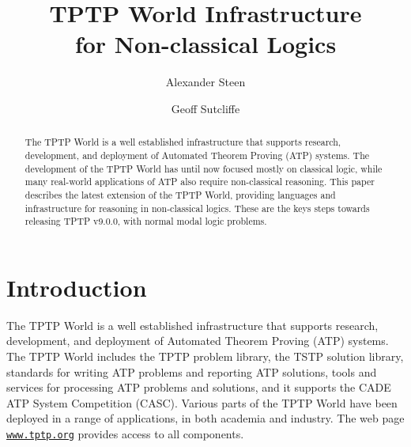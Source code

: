 \documentclass[runningheads]{llncs}
\begin{document}
\title{TPTP World Infrastructure \\ for Non-classical Logics}

\author{Alexander Steen 
\and
Geoff Sutcliffe}

\maketitle
\begin{abstract}
The TPTP World is a well established infrastructure that supports research, 
development, and deployment of Automated Theorem Proving (ATP) systems.
The development of the TPTP World has until now focused mostly on classical logic, while many 
real-world applications of ATP also require non-classical reasoning. 
This paper describes the latest extension of the TPTP World, providing languages and
infrastructure for reasoning in non-classical logics.
These are the keys steps towards releasing TPTP v9.0.0, with normal modal logic problems.

\end{abstract}
\section{Introduction}
\label{Introduction}

The TPTP World \cite{Sut17} is a well established infrastructure that supports research, 
development, and deployment of Automated Theorem Proving (ATP) systems.
The TPTP World includes the TPTP problem library,
the TSTP solution library,
standards for writing ATP problems and reporting ATP solutions,
tools and services for processing ATP problems and solutions,
and it supports the CADE ATP System Competition (CASC).
Various parts of the TPTP World have been deployed in a range of applications,
in both academia and industry.
The web page \href{https://www.tptp.org}{\tt www.tptp.org} provides access to all 
components.
\end{document}
